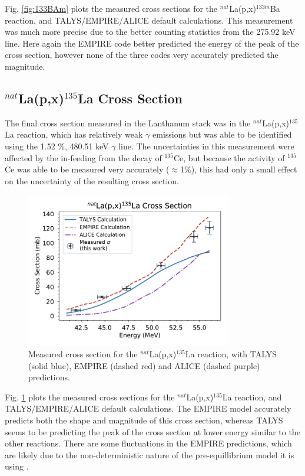 \documentclass[aps,superscriptaddress,twocolumn,secnumarabic,balancelastpage,amsmath,amssymb,nofootinbib,floatfix]{revtex4-1}
\begin{document}
Fig. \ref{fig:133BAm} plots the measured cross sections for the $^{nat}$La(p,x)$^{133m}$Ba reaction, and TALYS/EMPIRE/ALICE default calculations.  This measurement was much more precise due to the better counting statistics from the 275.92 keV line.  Here again the EMPIRE code better predicted the energy of the peak of the cross section, however none of the three codes very accurately predicted the magnitude.

\subsection{$^{nat}$La(p,x)$^{135}$La Cross Section}

The final cross section measured in the Lanthanum stack was in the $^{nat}$La(p,x)$^{135}$La reaction, which has relatively weak $\gamma$ emissions but was able to be identified using the 1.52 \%, 480.51 keV $\gamma$ line.  The uncertainties in this measurement were affected by the in-feeding from the decay of $^{135}$Ce, but because the activity of $^{135}$Ce was able to be measured very accurately ($\approx$1\%), this had only a small effect on the uncertainty of the resulting cross section.

\begin{figure}[htb]
\includegraphics[width=9cm]{cross_sections/135LA}
\caption{Measured cross section for the $^{nat}$La(p,x)$^{135}$La reaction, with TALYS (solid blue), EMPIRE (dashed red) and ALICE (dashed purple) predictions.
}
\label{fig:135LA}
\end{figure}

Fig. \ref{fig:135LA} plots the measured cross sections for the $^{nat}$La(p,x)$^{135}$La reaction, and TALYS/EMPIRE/ALICE default calculations.  The EMPIRE model accurately predicts both the shape and magnitude of this cross section, whereas TALYS seems to be predicting the peak of the cross section at lower energy similar to the other reactions.  There are some fluctuations in the EMPIRE predictions, which are likely due to the non-deterministic nature of the pre-equillibrium model it is using \cite{HERMAN20072655}.
\end{document}
